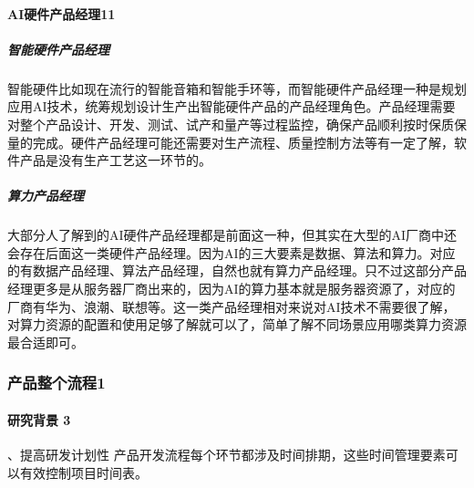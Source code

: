 \documentclass[letterpaper,10pt,english]{sphinxmanual}
\begin{document}


\paragraph{AI硬件产品经理11\sphinxfootnotemark[795]}
\label{\detokenize{chapter_project/AI_hardware:ai11}}%
\begin{footnotetext}[795]\sphinxAtStartFootnote
{}
%
\end{footnotetext}\ignorespaces 

\subparagraph{智能硬件产品经理}
\label{\detokenize{chapter_project/AI_hardware:id31}}
智能硬件比如现在流行的智能音箱和智能手环等，而智能硬件产品经理一种是规划应用AI技术，统筹规划设计生产出智能硬件产品的产品经理角色。产品经理需要对整个产品设计、开发、测试、试产和量产等过程监控，确保产品顺利按时保质保量的完成。硬件产品经理可能还需要对生产流程、质量控制方法等有一定了解，软件产品是没有生产工艺这一环节的。


\subparagraph{算力产品经理}
\label{\detokenize{chapter_project/AI_hardware:id32}}
大部分人了解到的AI硬件产品经理都是前面这一种，但其实在大型的AI厂商中还会存在后面这一类硬件产品经理。因为AI的三大要素是数据、算法和算力。对应的有数据产品经理、算法产品经理，自然也就有算力产品经理。只不过这部分产品经理更多是从服务器厂商出来的，因为AI的算力基本就是服务器资源了，对应的厂商有华为、浪潮、联想等。这一类产品经理相对来说对AI技术不需要很了解，对算力资源的配置和使用足够了解就可以了，简单了解不同场景应用哪类算力资源最合适即可。


\subsubsection{产品整个流程1\sphinxfootnotemark[796]}
\label{\detokenize{chapter_project/process:id1}}\label{\detokenize{chapter_project/process::doc}}%
\begin{footnotetext}[796]\sphinxAtStartFootnote
{}
%
\end{footnotetext}\ignorespaces 

\paragraph{研究背景 3\sphinxfootnotemark[797]}
\label{\detokenize{chapter_project/process:id2}}%
\begin{footnotetext}[797]\sphinxAtStartFootnote
{}
%
\end{footnotetext}、提高研发计划性
产品开发流程每个环节都涉及时间排期，这些时间管理要素可以有效控制项目时间表。
\end{document}
